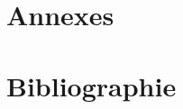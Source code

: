\documentclass{book}
\begin{document}
\backmatter
\section{Annexes}
\section{Bibliographie}



\end{document}
